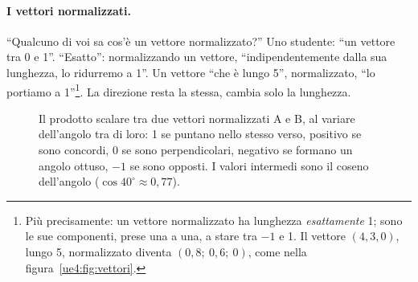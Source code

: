 \paragraph{I vettori normalizzati.} ``Qualcuno di voi sa cos'è un vettore
normalizzato?'' Uno studente: ``un vettore tra 0 e 1''. ``Esatto'': normalizzando un
vettore, ``indipendentemente dalla sua lunghezza, lo ridurremo a 1''. Un vettore ``che
è lungo 5'', normalizzato, ``lo portiamo a 1''\footnote{Più precisamente: un vettore
normalizzato ha lunghezza \emph{esattamente} 1; sono le sue componenti, prese una a
una, a stare tra $-1$ e 1. Il vettore $(4,3,0)$, lungo 5, normalizzato diventa
$(0{,}8;\ 0{,}6;\ 0)$, come nella figura~\ref{ue4:fig:vettori}.}. La direzione resta la
stessa, cambia solo la lunghezza.

\begin{figure}[htbp]
\centering
{}
\caption{Il prodotto scalare tra due vettori normalizzati A e B, al variare
dell'angolo tra di loro: 1 se puntano nello stesso verso, positivo se sono concordi,
0 se sono perpendicolari, negativo se formano un angolo ottuso, $-1$ se sono opposti.
I valori intermedi sono il coseno dell'angolo ($\cos 40^\circ \approx 0{,}77$).}
\label{ue4:fig:dot}
\end{figure}

